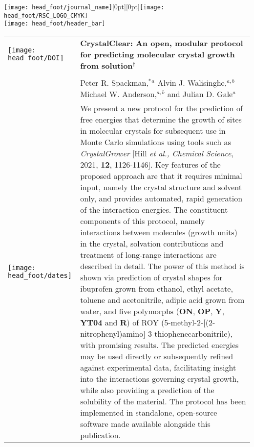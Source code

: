 \documentclass[twoside,twocolumn,9pt]{article}
\begin{document}
  \begin{@twocolumnfalse}
{\texttt{[image: head\_foot/journal\_name]}\hfill\raisebox{0pt}[0pt][0pt]{\texttt{[image: head\_foot/RSC\_LOGO\_CMYK]}}\\[1ex]
\texttt{[image: head\_foot/header\_bar]}}\par
\vspace{1em}
\sffamily
\begin{tabular}{m{4.5cm} p{13.5cm} }

\texttt{[image: head\_foot/DOI]} & \noindent\LARGE{\textbf{CrystalClear: An open, modular protocol for predicting molecular crystal growth from solution$^\dag$}} \\
\vspace{0.3cm} & \vspace{0.3cm} \\

 & \noindent\large{Peter R. Spackman,$^{\ast}$\textit{$^{a}$} Alvin J. Walisinghe,\textit{$^{a,b}$} Michael W. Anderson,\textit{$^{a,b}$} and Julian D. Gale\textit{$^{a}$}} \\

\texttt{[image: head\_foot/dates]} & \noindent\normalsize{We present a new protocol for the prediction of free energies that determine the growth of sites in molecular crystals for subsequent use in Monte Carlo simulations using tools such as \textit{CrystalGrower} [Hill \textit{et al., Chemical Science}, 2021, \textbf{12}, 1126-1146]. Key features of the proposed approach are that it requires minimal input, namely the crystal structure and solvent only, and provides automated, rapid generation of the interaction energies. The constituent components of this protocol, namely interactions between molecules (growth units) in the crystal, solvation contributions and treatment of long-range interactions are described in detail. The power of this method is shown via prediction of crystal shapes for ibuprofen grown from ethanol, ethyl acetate, toluene and acetonitrile, adipic acid grown from water, and five polymorphs (\textbf{ON}, \textbf{OP}, \textbf{Y}, \textbf{YT04} and \textbf{R}) of ROY (5-methyl-2-[(2-nitrophenyl)amino]-3-thiophenecarbonitrile), with promising results. The predicted energies may be used directly or subsequently refined against experimental data, facilitating insight into the interactions governing crystal growth, while also providing a prediction of the solubility of the material. The protocol has been implemented in standalone, open-source software made available alongside this publication.
  } \\

\end{tabular}

 \end{@twocolumnfalse} \vspace{0.6cm}
\end{document}
